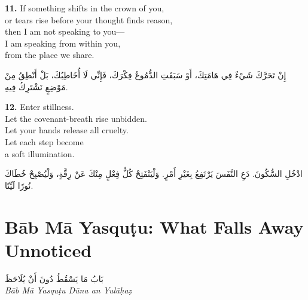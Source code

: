 \documentclass[11pt,a4paper,twoside]{book}
\begin{document}
\vspace{1em}
{\color{indigo}\bfseries 11.}\quad
If something shifts in the crown of you,\\
or tears rise before your thought finds reason,\\
then I am not speaking to you—\\
I am speaking from within you,\\
from the place we share.

\begin{flushright}
{\arabicfont
إِنْ تَحَرَّكَ شَيْءٌ فِي هَامَتِكَ،
أَوْ سَبَقَتِ الدُّمُوعُ فِكْرَكَ،
فَإِنِّي لَا أُخَاطِبُكَ،
بَلْ أَنْطِقُ مِنْ مَوْضِعٍ
نَشْتَرِكُ فِيهِ.}
\end{flushright}

\vspace{1em}
{\color{indigo}\bfseries 12.}\quad
Enter stillness.\\
Let the covenant-breath rise unbidden.\\
Let your hands release all cruelty.\\
Let each step become\\
a soft illumination.

\begin{flushright}
{\arabicfont
ادْخُلِ السُّكُونَ.
دَعِ النَّفَسَ يَرْتَفِعُ بِغَيْرِ أَمْرٍ.
وَلْيَنْفَتِحْ كُلُّ فِعْلٍ مِنْكَ عَنْ رِقَّةٍ،
وَلْيُصْبِحْ خُطَاكَ
نُورًا لَيِّنًا.}
\end{flushright}

\clearpage


\chapter*{Bāb Mā Yasquṭu: What Falls Away Unnoticed}
\begin{center}
{\arabicfont\Large بَابُ مَا يَسْقُطُ دُونَ أَنْ يُلَاحَظَ}\\[5pt]
{\small\itshape Bāb Mā Yasquṭu Dūna an Yulāḥaẓ}
\end{center}
\end{document}
